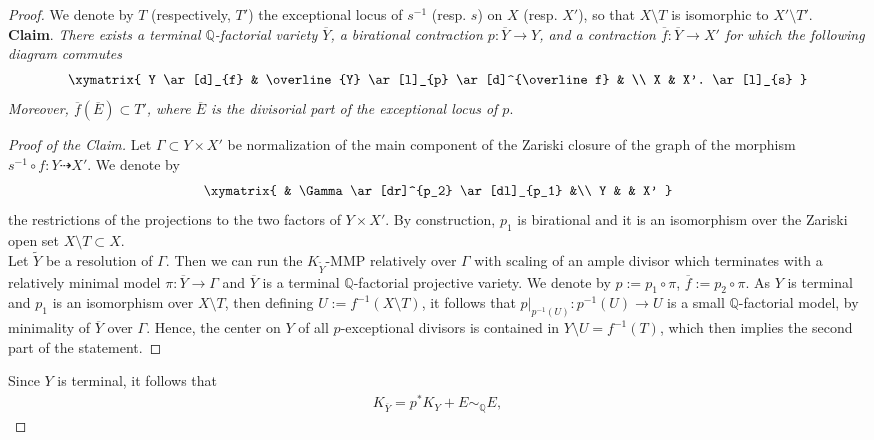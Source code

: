 \documentclass{amsart}[12pt,a4paper]
\theoremstyle{definition}
\begin{document}
\begin{proof}
We denote by $T$ (respectively, $T'$) the exceptional locus of $s^{-1}$ (resp. $s$) on $X$ (resp. $X'$), so that $X \setminus T$ is isomorphic to $X' \setminus T'$.\\

{\bf Claim}. 
{\it
There exists a terminal $\mathbb{Q}$-factorial variety $\overline Y$, a birational contraction $p \colon \overline{Y} \to Y$, and a contraction $\overline{f} \colon \overline{Y} \to X'$ for which the following diagram commutes
 \begin{eqnarray}\label{res.indet}
  \xymatrix{
  Y \ar[d]_{f} & \overline{Y} \ar[l]_{p} \ar[d]^{\overline f} & \\
  X & X'. \ar[l]_{s}
  }
 \end{eqnarray}
Moreover, $\overline{f}(\overline E) \subset T'$, where $\overline E$ is the divisorial part of the exceptional locus of $p$}.
\begin{proof}[Proof of the Claim]
Let $\Gamma \subset Y \times X'$ be normalization of the main component of the Zariski closure  of the graph of the morphism $s^{-1} \circ f \colon Y \dashrightarrow X'$.
We denote by
\[
\xymatrix{
& \Gamma \ar[dr]^{p_2} \ar[dl]_{p_1} &\\
Y & & X'
}
\]
the restrictions of the projections to the two factors of $Y \times X'$.
By construction, $p_1$ is birational and it is an isomorphism over the Zariski open set $X\setminus T \subset X$.
\\
Let $\widetilde Y$ be a resolution of $\Gamma$.
Then we can run the $K_{\widetilde Y}$-MMP relatively over $\Gamma$ with scaling of an ample divisor which terminates with a relatively minimal model $\pi \colon \overline{Y} \to \Gamma$ and $\overline{Y}$ is a terminal $\mathbb{Q}$-factorial projective variety.
We denote by $p:=p_1 \circ \pi$, $\overline f := p_2 \circ \pi$.
As $Y$ is terminal and $p_1$ is an isomorphism over $X \setminus T$, then defining $U := f^{-1}(X \setminus T)$, it follows that $p\vert_{p^{-1}(U)} \colon p^{-1}(U) \to U$ is a small $\mathbb{Q}$-factorial model, by minimality of $\overline{Y}$ over $\Gamma$.
Hence, the center on $Y$ of all $p$-exceptional divisors is contained in $Y \setminus U=f^{-1}(T)$, which then implies the second part of the statement.
\end{proof} 
\noindent
Since $Y$ is terminal, it follows that 
\begin{align}
\label{eqn:terminal.mod}
K_{\overline{Y}}= p^\ast K_Y + E \sim_\mathbb{Q} E,
\end{align} 

\end{proof}
\end{document}
